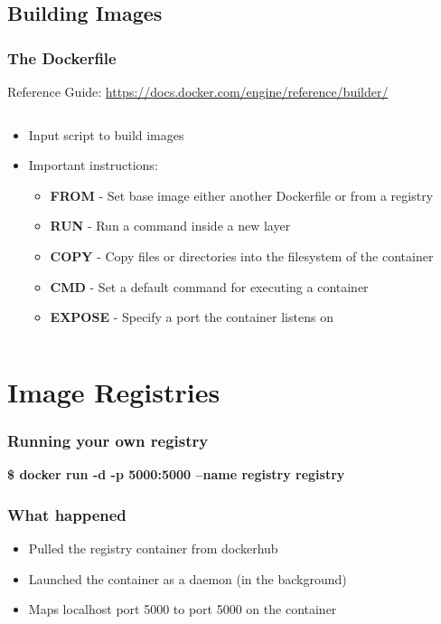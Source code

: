 \documentclass[aspectratio=169,11pt,hyperref={colorlinks=true}]{beamer}
\begin{document}
\subsection{Building Images}
\begin{frame}
    \frametitle{The Dockerfile}
    Reference Guide: \href{https://docs.docker.com/engine/reference/builder/}{https://docs.docker.com/engine/reference/builder/}
    \begin{columns}[T]
        \begin{column}{.41\textwidth}
            \begin{itemize}
                \item Input script to build images
                \item Important instructions:
                \begin{itemize}
                    \item \textbf{FROM} - Set base image either another Dockerfile or from a registry
                    \item \textbf{RUN} - Run a command inside a new layer
                    \item \textbf{COPY} - Copy files or directories into the filesystem of the container
                    \item \textbf{CMD} - Set a default command for executing a container
                    \item \textbf{EXPOSE} - Specify a port the container listens on
                \end{itemize}
            \end{itemize}
        \end{column}
        \begin{column}{.55\textwidth}
            \inputminted[fontsize=\scriptsize,breaklines,]{dockerfile}{examples/uwsgi/Dockerfile}
        \end{column}
    \end{columns}
\end{frame}


\section{Image Registries}
\begin{frame}
    \frametitle{Running your own registry}
    \textbf{\$ docker run -d -p 5000:5000 --name registry registry}
\end{frame}

\begin{frame}
    \frametitle{What happened}
    \begin{itemize}
        \item Pulled the registry container from dockerhub
        \item Launched the container as a daemon (in the background)
        \item Maps localhost port 5000 to port 5000 on the container
    \end{itemize}
\end{frame}
\end{document}
